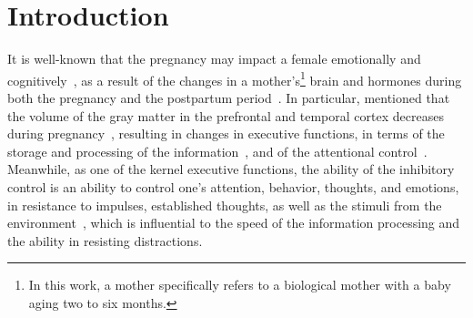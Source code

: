 \chapter{Introduction}\label{chp.introduction} 




It is well-known that the pregnancy may impact a female
emotionally and cognitively~\citep{jarrahi1969emotional}, 
as a result of the changes in a mother's\footnote{In this work,
a mother specifically refers to a biological mother
with a baby aging two to six months.}
brain and hormones
during both the pregnancy and the postpartum period~\citep{hoekzema2017pregnancy}.
In particular,
\citeauthor{hoekzema2017pregnancy} mentioned that
the volume of the gray matter  
in the prefrontal and temporal cortex decreases 
during pregnancy~\citep{hoekzema2017pregnancy}, 
resulting in changes in executive functions, in terms of 
the storage and processing of the information~\citep{de2006differences},
and of the attentional control~\citep{thompson2014here}. 
Meanwhile,
as one of the kernel executive functions, the ability of the inhibitory control is an ability to control one's attention, behavior, thoughts, and emotions, in resistance to impulses, established thoughts, as well as the stimuli from the environment~\citep{diamond2013executive}, which is influential to the speed of the information processing and the ability in resisting distractions. 


